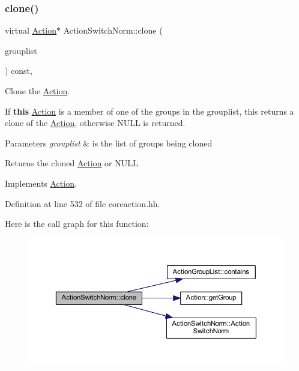 \subsubsection{\texorpdfstring{clone()}{clone()}}
{\footnotesize\ttfamily virtual \mbox{\hyperlink{class_action}{Action}}$\ast$ Action\+Switch\+Norm\+::clone (\begin{DoxyParamCaption}\item[{const \mbox{\hyperlink{class_action_group_list}{Action\+Group\+List}} \&}]{grouplist }\end{DoxyParamCaption}) const\hspace{0.3cm}{\ttfamily [inline]}, {\ttfamily [virtual]}}



Clone the \mbox{\hyperlink{class_action}{Action}}. 

If {\bfseries{this}} \mbox{\hyperlink{class_action}{Action}} is a member of one of the groups in the grouplist, this returns a clone of the \mbox{\hyperlink{class_action}{Action}}, otherwise N\+U\+LL is returned. 
\begin{DoxyParams}{Parameters}
{\em grouplist} & is the list of groups being cloned \\
\hline
\end{DoxyParams}
\begin{DoxyReturn}{Returns}
the cloned \mbox{\hyperlink{class_action}{Action}} or N\+U\+LL 
\end{DoxyReturn}


Implements \mbox{\hyperlink{class_action_af8242e41d09e5df52f97df9e65cc626f}{Action}}.



Definition at line 532 of file coreaction.\+hh.

Here is the call graph for this function\+:
\nopagebreak
\begin{figure}[H]
\begin{center}
\leavevmode
\includegraphics[width=350pt]{class_action_switch_norm_a006f767268c4794b34b61face5a620cd_cgraph}
\end{center}
\end{figure}


